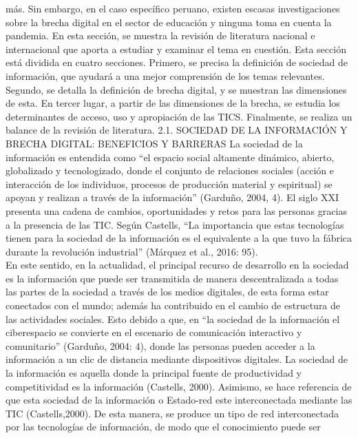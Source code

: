 \begin{enumerate}
  más. Sin embargo, en el caso específico peruano, existen escasas
  investigaciones sobre la brecha digital en el sector de educación y
  ninguna toma en cuenta la pandemia. En esta sección, se muestra la
  revisión de literatura nacional e internacional que aporta a estudiar
  y examinar el tema en cuestión. Esta sección está dividida en cuatro
  secciones. Primero, se precisa la definición de sociedad de
  información, que ayudará a una mejor comprensión de los temas
  relevantes. Segundo, se detalla la definición de brecha digital, y se
  muestran las dimensiones de esta. En tercer lugar, a partir de las
  dimensiones de la brecha, se estudia los determinantes de acceso, uso
  y apropiación de las TICS. Finalmente, se realiza un balance de la
  revisión de literatura. 2.1. SOCIEDAD DE LA INFORMACIÓN Y BRECHA
  DIGITAL: BENEFICIOS Y BARRERAS La sociedad de la información es
  entendida como ``el espacio social altamente dinámico, abierto,
  globalizado y tecnologizado, donde el conjunto de relaciones sociales
  (acción e interacción de los individuos, procesos de producción
  material y espiritual) se apoyan y realizan a través de la
  información'' (Garduño, 2004, 4). El siglo XXI presenta una cadena de
  cambios, oportunidades y retos para las personas gracias a la
  presencia de las TIC. Según Castells, ``La importancia que estas
  tecnologías tienen para la sociedad de la información es el
  equivalente a la que tuvo la fábrica durante la revolución
  industrial'' (Márquez et al., 2016: 95).\\
  En este sentido, en la actualidad, el principal recurso de desarrollo
  en la sociedad es la información que puede ser transmitida de manera
  descentralizada a todas las partes de la sociedad a través de los
  medios digitales, de esta forma estar conectados con el mundo; además
  ha contribuido en el cambio de estructura de las actividades sociales.
  Esto debido a que, en ``la sociedad de la información el ciberespacio
  se convierte en el escenario de comunicación interactivo y
  comunitario'' (Garduño, 2004: 4), donde las personas pueden acceder a
  la información a un clic de distancia mediante dispositivos digitales.
  La sociedad de la información es aquella donde la principal fuente de
  productividad y competitividad es la información (Castells, 2000).
  Asimismo, se hace referencia de que esta sociedad de la información o
  Estado-red este interconectada mediante las TIC (Castells,2000). De
  esta manera, se produce un tipo de red interconectada por las
  tecnologías de información, de modo que el conocimiento puede ser

\end{enumerate}
